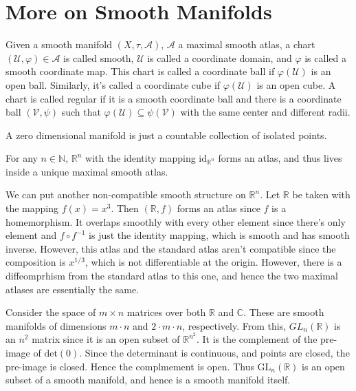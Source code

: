 \documentclass{article}                                                        %
\begin{document}
    \section{More on Smooth Manifolds}
        Given a smooth manifold $(X,\tau,\mathcal{A})$, $\mathcal{A}$ a maximal
        smooth atlas, a chart $(\mathcal{U},\varphi)\in\mathcal{A}$ is called
        smooth, $\mathcal{U}$ is called a coordinate domain, and $\varphi$ is
        called a smooth coordinate map. This chart is called a coordinate ball
        if $\varphi(\mathcal{U})$ is an open ball. Similarly, it's called a
        coordinate cube if $\varphi(\mathcal{U})$ is an open cube. A chart is
        called regular if it is a smooth coordinate ball and there is a
        coordinate ball $(\mathcal{V},\psi)$ such that
        $\varphi(\mathcal{U})\subseteq\psi(\mathcal{V})$ with the same center
        and different radii.
        \begin{example}
            A zero dimensional manifold is just a countable collection of
            isolated points.
        \end{example}
        \begin{example}
            For any $n\in\mathbb{N}$, $\mathbb{R}^{n}$ with the identity mapping
            $\textrm{id}_{\mathbb{R}^{n}}$ forms an atlas, and thus lives inside
            a unique maximal smooth atlas.
        \end{example}
        \begin{example}
            We can put another non-compatible smooth structure on
            $\mathbb{R}^{n}$. Let $\mathbb{R}$ be taken with the mapping
            $f(x)=x^{3}$. Then $(\mathbb{R},f)$ forms an atlas since $f$ is a
            homemorphism. It overlaps smoothly with every other element since
            there's only element and $f\circ{f}^{\minus{1}}$ is just the
            identity mapping, which is smooth and has smooth inverse. However,
            this atlas and the standard atlas aren't compatible since the
            composition is $x^{1/3}$, which is not differentiable at the origin.
            However, there is a diffeomprhism from the standard atlas to this
            one, and hence the two maximal atlases are essentially the same.
        \end{example}
        \begin{example}
            Consider the space of $m\times{n}$ matrices over both $\mathbb{R}$
            and $\mathbb{C}$. These are smooth manifolds of dimensions
            $m\cdot{n}$ and $2\cdot{m}\cdot{n}$, respectively. From this,
            $GL_{n}(\mathbb{R})$ is an $n^{2}$ matrix since it is an open subset
            of $\mathbb{R}^{n^{2}}$. It is the complement of the pre-image of
            $\textrm{det}(0)$. Since the determinant is continuous, and points
            are closed, the pre-image is closed. Hence the complmement is open.
            Thus $\textrm{GL}_{n}(\mathbb{R})$ is an open subset of a smooth
            manifold, and hence is a smooth manifold itself.
        \end{example}
\end{document}

